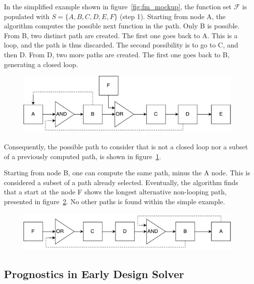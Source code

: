 In the simplified example shown in figure~\ref{fig:fm_mockup}, the function set $\mathscr{F}$ is populated with $S = \{A, B, C, D, E, F\}$ (step 1). Starting from node A, the algorithm computes the possible next function in the path. Only B is possible. From B, two distinct path are created. The first one goes back to A. This is a loop, and the path is thus discarded. The second possibility is to go to C, and then D. From D, two more paths are created. The first one goes back to B, generating a closed loop.

\begin{figure}[!htb]
	\centering
	\includegraphics[height=0.2\textheight]{fig/patha}
	\label{fig:path_a}
\end{figure}

Consequently, the possible path to consider that is not a closed loop nor a subset of a previously computed path, is shown in figure~\ref{fig:path_a}.

Starting from node B, one can compute the same path, minus the A node. This is considered a subset of a path already selected. Eventually, the algorithm finds that a start at the node F shows the longest alternative non-looping path, presented in figure~\ref{fig:path_b}. No other paths is found within the simple example.

\begin{figure}[!htb]
	\centering
	\includegraphics[height=0.13\textheight]{fig/pathb}
	\label{fig:path_b}
\end{figure}

\subsection{Prognostics in Early Design Solver}

